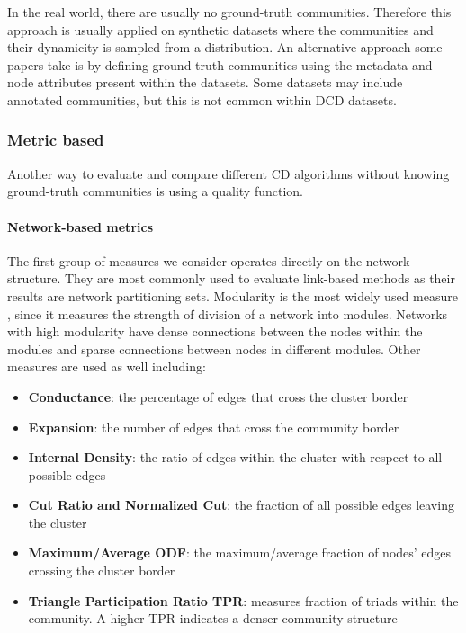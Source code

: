 \documentclass[
acmsmall,
nonacm,
screen,
acmthm]{acmart}
\providecommand{\tightlist}{%
\setlength{\itemsep}{0pt}\setlength{\parskip}{0pt}}
\begin{document}
In the real world, there are usually no ground-truth communities.
Therefore this approach is usually applied on synthetic datasets where
the communities and their dynamicity is sampled from a distribution. An
alternative approach some papers take is by defining ground-truth
communities using the metadata and node attributes present within the
datasets. Some datasets may include annotated communities, but this is
not common within DCD datasets.

\hypertarget{metric-based}{%
\subsubsection{Metric based}\label{metric-based}}

Another way to evaluate and compare different CD algorithms without
knowing ground-truth communities is using a quality function.

\hypertarget{network-based-metrics}{%
\paragraph{Network-based metrics}\label{network-based-metrics}}

The first group of measures we consider operates directly on the network
structure. They are most commonly used to evaluate link-based methods as
their results are network partitioning sets. Modularity is the most
widely used measure
\citep{newmanFastAlgorithmDetecting2004, suComprehensiveSurveyCommunity2021},
since it measures the strength of division of a network into modules.
Networks with high modularity have dense connections between the nodes
within the modules and sparse connections between nodes in different
modules. Other measures are used as well including:

\begin{itemize}
\tightlist
\item
  \textbf{Conductance}: the percentage of edges that cross the cluster
  border
\item
  \textbf{Expansion}: the number of edges that cross the community
  border
\item
  \textbf{Internal Density}: the ratio of edges within the cluster with
  respect to all possible edges
\item
  \textbf{Cut Ratio and Normalized Cut}: the fraction of all possible
  edges leaving the cluster
\item
  \textbf{Maximum/Average ODF}: the maximum/average fraction of nodes'
  edges crossing the cluster border
\item
  \textbf{Triangle Participation Ratio TPR}: measures fraction of triads
  within the community. A higher TPR indicates a denser community
  structure
\end{itemize}
\end{document}

